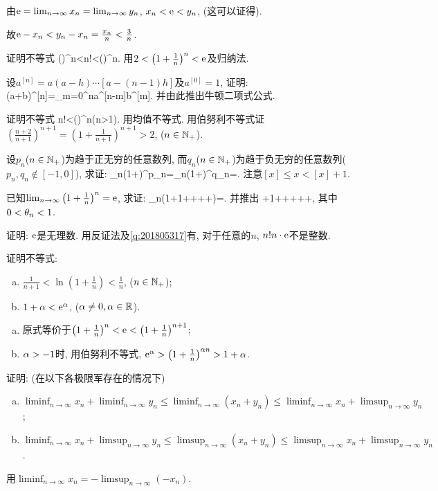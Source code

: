 由$\mathrm{e}=\lim_{n\to\infty}x_n=\lim_{n\to\infty}y_n$, $x_n<\mathrm{e}<y_n$, (这可以证得{}).

故$\mathrm{e}-x_n<y_n-x_n=\frac{x_n}{n}<\frac3n$.
\ea

\bq{}{}
证明不等式
\bee
\left(\right)^n<n!<\ue\left(\right)^n.
\eee
\eq
\ba
用$2<\left(1+\frac1n\right)^n<\mathrm{e}$及归纳法.
\ea

\bq{}{}
设$a^{[n]}=a(a-h)\cdots[a-(n-1)h]$及$a^{[0]}=1$, 证明:
\bee
(a+b)^{[n]}=\sum_{m=0}^{n}a^{[n-m]}b^{[m]}.
\eee
并由此推出牛顿二项式公式.
\eq

\bq{}{}
证明不等式
\bee
n!<\left(\right)^n\quad (n>1).
\eee
\eq
\ba
用均值不等式.
\ea
\ba
用伯努利不等式证$\left(\frac{n+2}{n+1}\right)^{n+1}=\left(1+\frac1{n+1}\right)^{n+1}>2$, ($n\in\mathbb{N}_{+}$).
\ea

\bq{}{}
设$p_n$($n\in\mathbb{N}_{+}$)为趋于正无穷的任意数列, 而$q_n$($n\in\mathbb{N}_{+}$)为趋于负无穷的任意数列($p_n, q_n\not\in[-1,0]$), 求证:
\bee
\lim_{n\to\infty}\left(1+\right)^{p_n}=\lim_{n\to\infty}\left(1+\right)^{q_{n}}=\ue.
\eee
\eq
\ba
注意$[x]\le x<[x]+1$.
\ea

已知$\lim_{n\to\infty}\left(1+\frac1n\right)^n=\mathrm{e}$, 求证:
\bee
\lim_{n\to\infty}\left(1+1+++\cdots+\right)=\ue.
\eee
并推出
\bee
{}+1+++\cdots++,
\eee
其中$0<\theta_n<1$.
\eq

\bq{}{}
证明: $\mathrm{e}$是无理数.
\eq
\ba
用反证法及\ref{q:201805317}有, 对于任意的$n$, $n!n\cdot\mathrm{e}$不是整数.
\ea

\bq{}{}
证明不等式:
\begin{enumerate}[(a)]
 \item $\frac{1}{n+1}<\ln\left(1+\frac1n\right)<\frac1n$, ($n\in\mathbb{N}_{+}$);
 \item $1+\alpha<\mathrm{e}^{\alpha}$, ($\alpha\ne0, \alpha\in\mathbb{R}$).
\end{enumerate}
\eq
\ba
\begin{enumerate}[(a)]
 \item 原式等价于$\left(1+\frac1n\right)^n<\mathrm{e}<\left(1+\frac1n\right)^{n+1}$;
 \item $\alpha>-1$时, 用伯努利不等式, $\mathrm{e}^{\alpha}>\left(1+\frac1n\right)^{\alpha n}>1+\alpha$.
\end{enumerate}
\ea

证明: (在以下各极限军存在的情况下)
\begin{enumerate}[(a)]
 \item $\liminf_{n\to\infty}x_n+\liminf_{n\to\infty}y_n\le\liminf_{n\to\infty}(x_n+y_n)\le\liminf_{n\to\infty}x_n+\limsup_{n\to\infty}y_n$;
 \item $\liminf_{n\to\infty}x_n+\limsup_{n\to\infty}y_n\le\limsup_{n\to\infty}(x_n+y_n)\le\limsup_{n\to\infty}x_n+\limsup_{n\to\infty}y_n$.
\end{enumerate}
\eq
\ba
用$\liminf_{n\to\infty}x_n=-\limsup_{n\to\infty}(-x_n)$.
\ea

